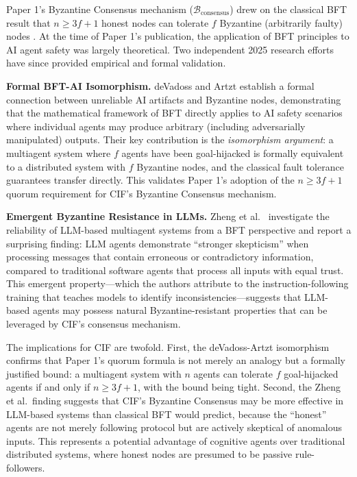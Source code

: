 \documentclass[
]{article}
\begin{document}
Paper 1's Byzantine Consensus mechanism
(\(\mathcal{B}_{\text{consensus}}\)) \cite{friedman2026cogsec1} drew on
the classical BFT result that \(n \geq 3f+1\) honest nodes can tolerate
\(f\) Byzantine (arbitrarily faulty) nodes \cite{lamport1982byzantine}.
At the time of Paper 1's publication, the application of BFT principles
to AI agent safety was largely theoretical. Two independent 2025
research efforts have since provided empirical and formal validation.

\textbf{Formal BFT-AI Isomorphism.} deVadoss and Artzt
\cite{devadoss2025bft} establish a formal connection between unreliable
AI artifacts and Byzantine nodes, demonstrating that the mathematical
framework of BFT directly applies to AI safety scenarios where
individual agents may produce arbitrary (including adversarially
manipulated) outputs. Their key contribution is the \emph{isomorphism
argument}: a multiagent system where \(f\) agents have been
goal-hijacked is formally equivalent to a distributed system with \(f\)
Byzantine nodes, and the classical fault tolerance guarantees transfer
directly. This validates Paper 1's adoption of the \(n \geq 3f+1\)
quorum requirement for CIF's Byzantine Consensus mechanism.

\textbf{Emergent Byzantine Resistance in LLMs.} Zheng et
al.~\cite{cpwbft2025} investigate the reliability of LLM-based
multiagent systems from a BFT perspective and report a surprising
finding: LLM agents demonstrate ``stronger skepticism'' when processing
messages that contain erroneous or contradictory information, compared
to traditional software agents that process all inputs with equal trust.
This emergent property---which the authors attribute to the
instruction-following training that teaches models to identify
inconsistencies---suggests that LLM-based agents may possess natural
Byzantine-resistant properties that can be leveraged by CIF's consensus
mechanism.

The implications for CIF are twofold. First, the deVadoss-Artzt
isomorphism confirms that Paper 1's quorum formula is not merely an
analogy but a formally justified bound: a multiagent system with \(n\)
agents can tolerate \(f\) goal-hijacked agents if and only if
\(n \geq 3f+1\), with the bound being tight. Second, the Zheng et
al.~finding suggests that CIF's Byzantine Consensus may be more
effective in LLM-based systems than classical BFT would predict, because
the ``honest'' agents are not merely following protocol but are actively
skeptical of anomalous inputs. This represents a potential advantage of
cognitive agents over traditional distributed systems, where honest
nodes are presumed to be passive rule-followers.
\end{document}
